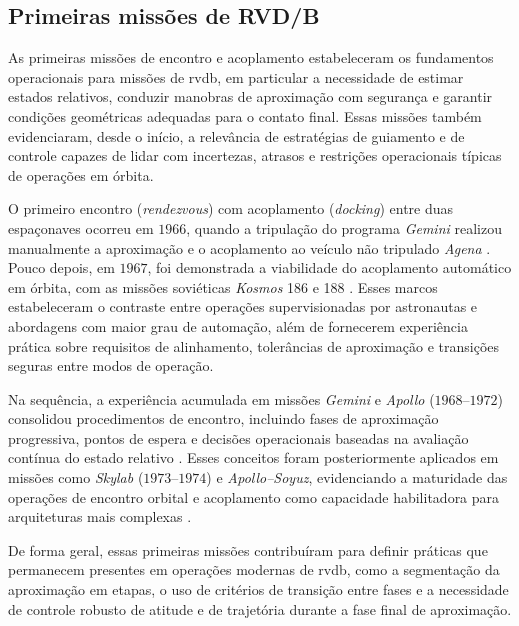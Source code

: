 \subsection{Primeiras missões de RVD/B}
\label{subsec_primeiras_missoes_rendezvous}

As primeiras missões de encontro e acoplamento estabeleceram os fundamentos operacionais para missões de \gls{rvdb}, em particular a necessidade de estimar estados relativos, conduzir manobras de aproximação com segurança e garantir condições geométricas adequadas para o contato final. 
Essas missões também evidenciaram, desde o início, a relevância de estratégias de guiamento e de controle capazes de lidar com incertezas, atrasos e restrições operacionais típicas de operações em órbita.

O primeiro encontro (\textit{rendezvous}) com acoplamento (\textit{docking}) entre duas espaçonaves ocorreu em $1966$, quando a tripulação do programa \emph{Gemini} realizou manualmente a aproximação e o acoplamento ao veículo não tripulado \emph{Agena} \cite{nasa1stDocking}. 
Pouco depois, em $1967$, foi demonstrada a viabilidade do acoplamento automático em órbita, com as missões soviéticas \emph{Kosmos} 186 e 188 \cite{nasaAutmaticDocking1967}. 
Esses marcos estabeleceram o contraste entre operações supervisionadas por astronautas e abordagens com maior grau de automação, além de fornecerem experiência prática sobre requisitos de alinhamento, tolerâncias de aproximação e transições seguras entre modos de operação.

Na sequência, a experiência acumulada em missões \textit{Gemini} e \textit{Apollo} ($1968$--$1972$) consolidou procedimentos de encontro, incluindo fases de aproximação progressiva, pontos de espera e decisões operacionais baseadas na avaliação contínua do estado relativo \cite{goodman2011rendezvous}. 
Esses conceitos foram posteriormente aplicados em missões como \emph{Skylab} ($1973$--$1974$) e \emph{Apollo--Soyuz}, evidenciando a maturidade das operações de encontro orbital e acoplamento como capacidade habilitadora para arquiteturas mais complexas \cite{goodman2011rendezvous}.

De forma geral, essas primeiras missões contribuíram para definir práticas que permanecem presentes em operações modernas de \gls{rvdb}, como a segmentação da aproximação em etapas, o uso de critérios de transição entre fases e a necessidade de controle robusto de atitude e de trajetória durante a fase final de aproximação. 
